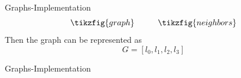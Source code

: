 \begin{frame}{Graphs-Implementation}
	\[
		\tikzfig{graph}
		\hspace{1cm}
		\tikzfig{neighbors}
	\]
	Then the graph can be represented as
	\[
		G= [l_0, l_1, l_2, l_3]
	\]
\end{frame}
%
\begin{frame}{Graphs-Implementation}
	
\end{frame}
